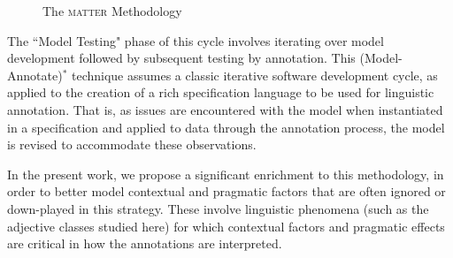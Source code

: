 \documentclass[10pt]{article}
\begin{document}

%
% 
%

\begin{figure}
  \centering
  \caption{The \textsc{matter} Methodology}
  \label{fig:matter}
\end{figure}

The ``Model Testing" phase of this cycle involves iterating over model development followed by subsequent testing by annotation. This  (Model-Annotate)$^*$ technique assumes a classic iterative software development cycle, as applied to the creation of a rich specification language to be used for linguistic annotation.  That is, as issues are encountered
with the model when instantiated in a specification and applied to data
through the annotation process, the model is revised to accommodate
these observations. 

In the present work, we propose a significant enrichment to this methodology, in order to better
model  contextual and pragmatic factors that are often ignored or down-played in this strategy. 
These involve linguistic phenomena (such as the adjective classes studied here) for which contextual factors and pragmatic effects are critical in how the annotations are interpreted.  
\end{document}

